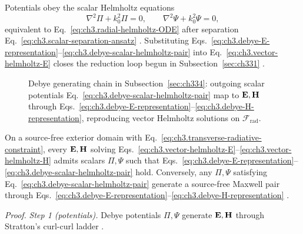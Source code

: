 Potentials obey the scalar Helmholtz equations
\begin{equation}
\label{eq:ch3.debye-scalar-helmholtz-pair}
\nabla^{2}\Pi+k_{0}^{2}\Pi=0,
\qquad
\nabla^{2}\Psi+k_{0}^{2}\Psi=0,
\end{equation}
equivalent to Eq.~\eqref{eq:ch3.radial-helmholtz-ODE} after separation
Eq.~\eqref{eq:ch3.scalar-separation-ansatz} \cite{stratton1941}. Substituting
Eqs.~\eqref{eq:ch3.debye-E-representation}--\eqref{eq:ch3.debye-scalar-helmholtz-pair} into
Eq.~\eqref{eq:ch3.vector-helmholtz-E} closes the reduction loop begun in Subsection~\ref{sec:ch331}
\cite{tai1994}.
\begin{figure}[t]
\centering
{}
\caption{Debye generating chain in Subsection~\ref{sec:ch334}: outgoing scalar potentials
Eq.~\eqref{eq:ch3.debye-scalar-helmholtz-pair} map to \(\mathbf{E},\mathbf{H}\) through
Eqs.~\eqref{eq:ch3.debye-E-representation}--\eqref{eq:ch3.debye-H-representation}, reproducing vector
Helmholtz solutions on \(\mathcal{F}_{\mathrm{rad}}\).}
\label{fig:ch3.debye-generating-chain}
\end{figure}
\begin{theorem}
\label{thm:ch3.debye-representation}
On a source-free exterior domain with Eq.~\eqref{eq:ch3.transverse-radiative-constraint}, every
\(\mathbf{E},\mathbf{H}\) solving Eqs.~\eqref{eq:ch3.vector-helmholtz-E}--\eqref{eq:ch3.vector-helmholtz-H} admits scalars
\(\Pi,\Psi\) such that Eqs.~\eqref{eq:ch3.debye-E-representation}--\eqref{eq:ch3.debye-scalar-helmholtz-pair}
hold. Conversely, any \(\Pi,\Psi\) satisfying Eq.~\eqref{eq:ch3.debye-scalar-helmholtz-pair} generate a
source-free Maxwell pair through Eqs.~\eqref{eq:ch3.debye-E-representation}--\eqref{eq:ch3.debye-H-representation}
\cite{stratton1941}.
\end{theorem}
\noindent\textit{Proof.}
\emph{Step 1 (potentials).} Debye potentials \(\Pi,\Psi\) generate \(\mathbf{E},\mathbf{H}\) through Stratton's curl-curl ladder .
